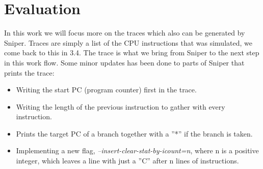 \chapter{Evaluation}
\label{chap:evaluation}
In this work we will focus more on the traces which also can be generated by Sniper.
Traces are simply a list of the CPU instructions that was simulated, we come back
to this in 3.4. \fixme The trace is what we bring from Sniper to the next step in this work
flow. Some minor updates has been done to parts of Sniper that prints the trace:
\begin{itemize}
\item Writing the start PC (program counter) first in the trace.
\item Writing the length of the previous instruction to gather with every instruction.
\item Prints the target PC of a branch together with a ”*” if the branch is taken.
\item Implementing a new flag,\emph{ –insert-clear-stat-by-icount=n}, where n is a positive
integer, which leaves a line with just a ”C” after n lines of instructions.	
\end{itemize}

